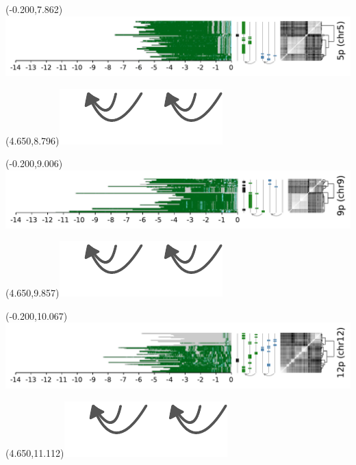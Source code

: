 \documentclass{article}
\begin{document}
\begin{textblock}{13}(-0.200,7.862)\includegraphics{Figure_4/chr5.pdf}\end{textblock}
\begin{textblock}{13}(4.650,8.796)\includegraphics[width=.81in,keepaspectratio]{Figure_4/fatter-arrows.pdf}\end{textblock}

\begin{textblock}{13}(-0.200,9.006)\includegraphics{Figure_4/chr9.pdf}\end{textblock}
\begin{textblock}{13}(4.650,9.857)\includegraphics[width=.81in,keepaspectratio]{Figure_4/fatter-arrows.pdf}\end{textblock}

\begin{textblock}{13}(-0.200,10.067)\includegraphics{Figure_4/chr12.pdf}\end{textblock}
\begin{textblock}{13}(4.650,11.112)\includegraphics[width=.81in,keepaspectratio]{Figure_4/fatter-arrows.pdf}\end{textblock}
\end{document}
